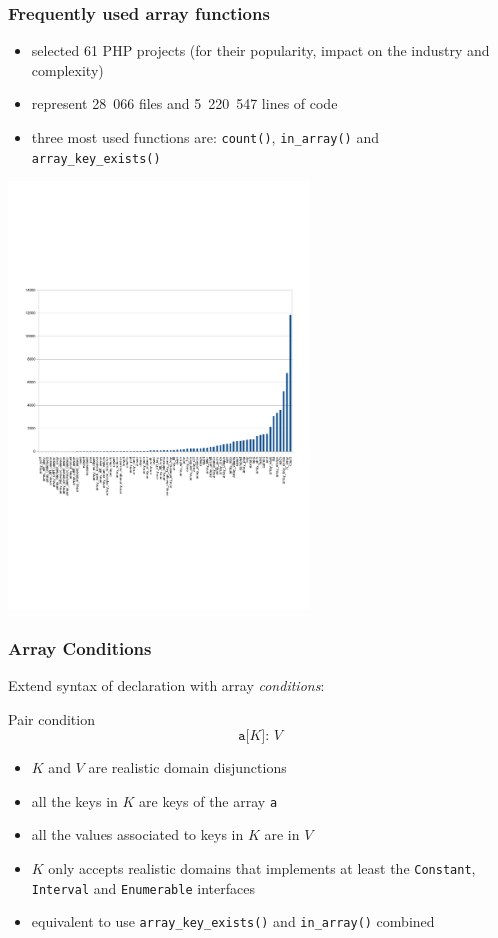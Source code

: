 \documentclass[9pt]{beamer}
\newcommand{\code}[1]{\texttt{#1}}
\begin{document}
\begin{frame}
\frametitle{Frequently used array functions}

\vspace{1em}
{
\small
\begin{itemize}
\item selected 61 PHP projects (for their popularity, impact on the industry and
complexity)
\item represent 28~066 files and 5~220~547 lines of code
\item three most used functions are: \code{count()}, \code{in\_array()} and
\code{array\_key\_exists()}
\end{itemize}
}

\begin{center}
\includegraphics[width=8cm]{Images/Chart.pdf}
\end{center}

\end{frame}

\begin{frame}
\frametitle{Array Conditions}

Extend syntax of declaration with array {\em conditions}:

\begin{block}{Pair condition}
$$\code{a[$K$]:~$V$}$$
\vspace{-1.5em}
\begin{itemize}
\item $K$ and $V$ are realistic domain disjunctions
\item all the keys in $K$ are keys of the array \code{a}
\item all the values associated to keys in $K$ are in $V$
\item $K$ only accepts realistic domains that implements at least the
\code{Constant}, \code{Interval} and \code{Enumerable} interfaces
\item equivalent to use \code{array\_key\_exists()} and \code{in\_array()}
combined
\end{itemize}
\end{block}


\end{frame}
\end{document}
